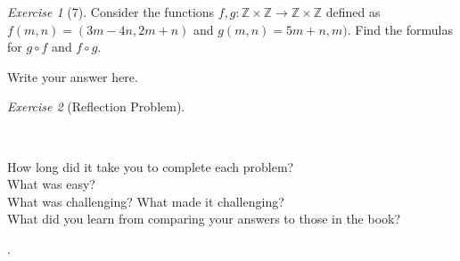 \documentclass[12pt]{amsart}
\makeatletter
\theoremstyle{remark}
\newtheorem*{exercise}{Exercise}%
\def\ZZ{\ensuremath{\mathbb Z}}
\renewenvironment{proof}[1][\proofname]{\par\doublespacing
  \pushQED{\qed}%
  \normalfont \topsep6\p@\@plus6\p@\relax
  \list{}{%
    \settowidth{\leftmargin}{\itshape\proofname:\hskip\labelsep}%
    \setlength{\labelwidth}{0pt}%
    \setlength{\itemindent}{-\leftmargin}%
  }%
  \item[\hskip\labelsep\itshape#1\@addpunct{:}]\ignorespaces
}{%
  \popQED\endlist\@endpefalse
  \singlespacing
}
\theoremstyle{mycomment}
\makeatother
\begin{document}
\begin{exercise}[7] Consider the functions $f,g:\ZZ\times \ZZ\to \ZZ\times \ZZ$ defined as $f(m,n)=(3m-4n,2m+n)$ and $g(m,n)=5m+n
,m)$. Find the formulas for $g\circ f$ and $f\circ g$.
\begin{proof}[Solution]
Write your answer here.
\end{proof}
\end{exercise}
\begin{exercise}[Reflection Problem] \ 

\begin{proof}[Answers] \ \\
\begin{description}
\item[How long did it take you to complete each problem?]
\item[What was easy?]
\item[What was challenging? What made it challenging?]
\item[What did you learn from comparing your answers to those in the book?]
\end{description}
\end{proof}
\end{exercise}.















 
\end{document}
